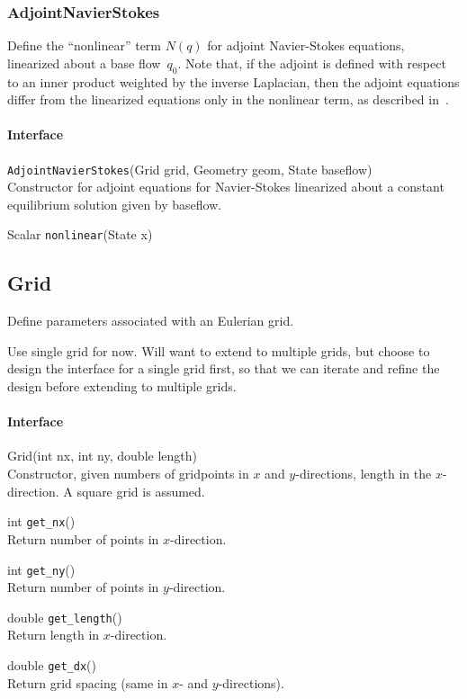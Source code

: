 \documentclass[11pt]{article}
\def\fn#1{{\tt #1}} %
\begin{document}
\subsubsection{AdjointNavierStokes}
Define the ``nonlinear'' term $N(q)$ for adjoint Navier-Stokes equations, linearized about a base flow~$q_0$.  Note that, if the adjoint is defined with respect to an inner product weighted by the inverse Laplacian, then the adjoint equations differ from the linearized equations only in the nonlinear term, as described in~\cite{AhuRow-08}.

\paragraph{Interface}
\begin{description}
	\item \fn{AdjointNavierStokes}(Grid grid, Geometry geom, State baseflow)\\
		Constructor for adjoint equations for Navier-Stokes linearized about a constant equilibrium solution given by baseflow.
	\item Scalar \fn{nonlinear}(State x)
\end{description}

\subsection{Grid}
Define parameters associated with an Eulerian grid.

Use single grid for now.  Will want to extend to multiple grids, but choose to design the interface for a single grid first, so that we can iterate and refine the design before extending to multiple grids.

\paragraph{Interface}
\begin{description}
	\item Grid(int nx, int ny, double length)\\
		Constructor, given numbers of gridpoints in $x$ and $y$-directions, length in the $x$-direction.  A square grid is assumed.
	\item int \fn{get\_nx}()\\
		Return number of points in $x$-direction.
	\item int \fn{get\_ny}()\\
		Return number of points in $y$-direction.
	\item double \fn{get\_length}()\\
		Return length in $x$-direction.
	\item double \fn{get\_dx}()\\
		Return grid spacing (same in $x$- and $y$-directions).
		
\end{description}
\end{document}
